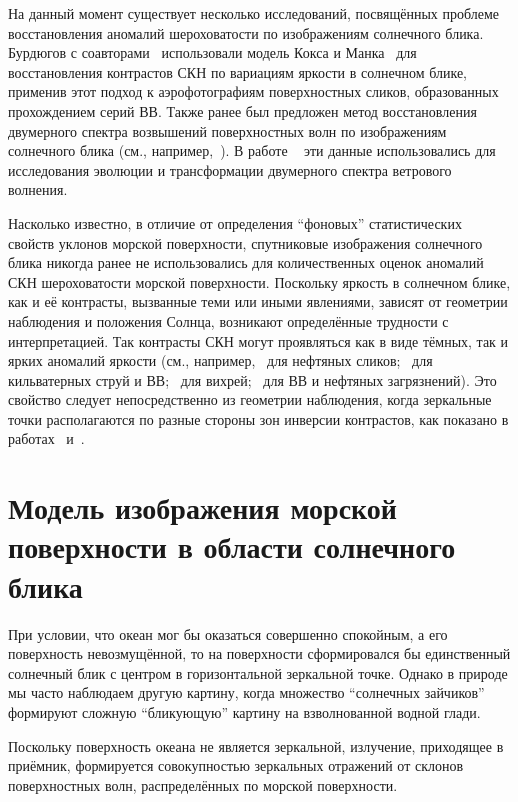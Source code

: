 На данный момент существует несколько исследований, посвящённых проблеме восстановления аномалий шероховатости по изображениям солнечного блика. Бурдюгов с соавторами~\citep{Burdyugov1987} использовали модель Кокса и Манка~\citep{Cox1954} для восстановления контрастов СКН по вариациям яркости в солнечном блике, применив этот подход к аэрофотографиям поверхностных сликов, образованных прохождением серий ВВ. Также ранее был предложен метод восстановления двумерного спектра возвышений поверхностных волн по изображениям солнечного блика (см., например,~\citep{Stilwell1969, Bolshakov1990}). В работе ~\citep{Bolshakov1990a} эти данные использовались для исследования эволюции и трансформации двумерного спектра ветрового волнения.

Насколько известно, в отличие от определения ``фоновых'' статистических свойств уклонов морской поверхности, спутниковые изображения солнечного блика никогда ранее не использовались для количественных оценок аномалий СКН шероховатости морской поверхности. Поскольку яркость в солнечном блике, как и её контрасты, вызванные теми или иными явлениями, зависят от геометрии наблюдения и положения Солнца, возникают определённые трудности с интерпретацией. Так контрасты СКН могут проявляться как в виде тёмных, так и ярких аномалий яркости (см., например,~\citep{Hu2009} для нефтяных сликов;~\citep{Matthews2005, Munk1987} для кильватерных струй и ВВ;~\citep{Munk2000} для вихрей;~\citep{Jackson2010} для ВВ и нефтяных загрязнений). Это свойство следует непосредственно из геометрии наблюдения, когда зеркальные точки располагаются по разные стороны зон инверсии контрастов, как показано в работах~\citep{Burdyugov1987} и~\citep{Jackson2010}.



\newpage

\section{Модель изображения морской поверхности в области солнечного блика} \label{sec:1.3}


При условии, что океан мог бы оказаться совершенно спокойным, а его поверхность невозмущённой, то на поверхности сформировался бы единственный солнечный блик с центром в горизонтальной зеркальной точке. Однако в природе мы часто наблюдаем другую картину, когда множество ``солнечных зайчиков'' формируют сложную ``бликующую'' картину на взволнованной водной глади.

Поскольку поверхность океана не является зеркальной, излучение, приходящее в приёмник, формируется совокупностью зеркальных отражений от склонов поверхностных волн, распределённых по морской поверхности.

